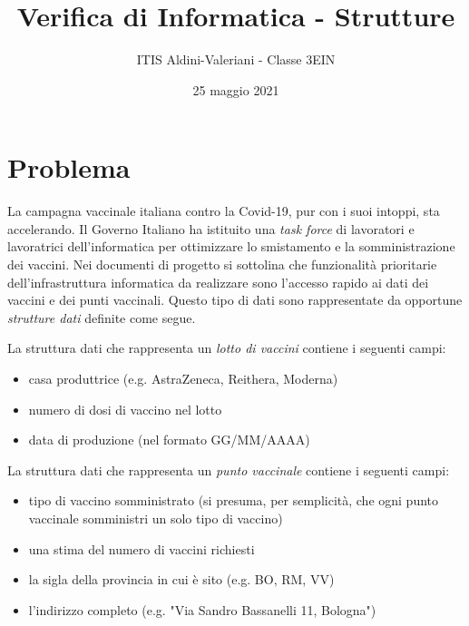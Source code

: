 \documentclass[a4paper, 11pt]{exam}
\title{Verifica di Informatica - Strutture}
\author{ITIS Aldini-Valeriani - Classe 3EIN}
\date{25 maggio 2021}
\begin{document}
\maketitle
\begin{center}

\end{center}
\vspace{1em}

\section*{Problema}

La campagna vaccinale italiana contro la Covid-19, pur con i suoi intoppi, sta accelerando. 
Il Governo Italiano ha istituito una \emph{task force} di lavoratori e lavoratrici dell'informatica per ottimizzare lo smistamento e la somministrazione dei vaccini.
Nei documenti di progetto si sottolina che funzionalità prioritarie dell'infrastruttura informatica da realizzare sono l'accesso rapido ai dati dei vaccini e dei punti vaccinali.
Questo tipo di dati sono rappresentate da opportune \emph{strutture dati} definite come segue.

La struttura dati che rappresenta un \emph{lotto di vaccini} contiene i seguenti campi:
\begin{itemize}
	\item casa produttrice (e.g. AstraZeneca, Reithera, Moderna)
	\item numero di dosi di vaccino nel lotto
	\item data di produzione (nel formato GG/MM/AAAA)
\end{itemize}

La struttura dati che rappresenta un \emph{punto vaccinale} contiene i seguenti campi:
\begin{itemize}
	\item tipo di vaccino somministrato (si presuma, per semplicità, che ogni punto vaccinale somministri un solo tipo di vaccino)
	\item una stima del numero di vaccini richiesti
	\item la sigla della provincia in cui è sito (e.g. BO, RM, VV)
	\item l'indirizzo completo (e.g. "Via Sandro Bassanelli 11, Bologna")
\end{itemize}
\end{document}
